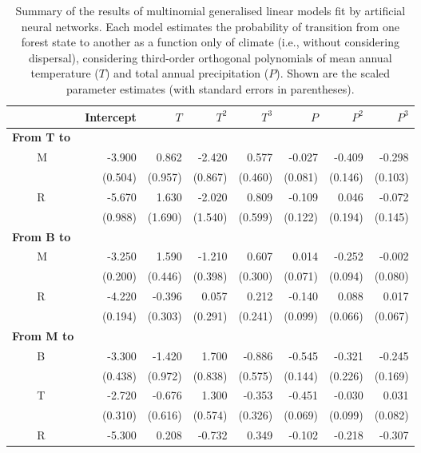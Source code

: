 \documentclass[11pt]{article}
\begin{document}
\begin{table}

\caption[Multinomial regression summary]{Summary of the results of multinomial generalised linear models fit by artificial neural networks.
Each model estimates the probability of transition from one forest state to another as a function only of climate (i.e., without considering dispersal), considering third-order orthogonal polynomials of mean annual temperature ($T$) and total annual precipitation ($P$).
Shown are the scaled parameter estimates (with standard errors in parentheses).
}

\begin{tabular}{llrrrrrrr}
\toprule
  &  & Intercept & $T$ & $T^2$ & $T^3$ & $P$ & $P^2$ & $P^3$ \\
\midrule
\multicolumn{2}{l}{\textbf{From T to}} \\
& \multirow{2}{*}{M} & -3.900 &  0.862 & -2.420 &  0.577 & -0.027 & -0.409 & -0.298 \\
& & (0.504) &  (0.957) &  (0.867) &  (0.460) &  (0.081) &  (0.146) &  (0.103) \\[3pt]
& \multirow{2}{*}{R} & -5.670 &  1.630 & -2.020 &  0.809 & -0.109 &  0.046 & -0.072 \\
& & (0.988) &  (1.690) &  (1.540) &  (0.599) &  (0.122) &  (0.194) &  (0.145) \\[3pt]
\multicolumn{2}{l}{\textbf{From B to}} \\
& \multirow{2}{*}{M} & -3.250 &  1.590 & -1.210 &  0.607 &  0.014 & -0.252 & -0.002 \\
& & (0.200) &  (0.446) &  (0.398) &  (0.300) &  (0.071) &  (0.094) &  (0.080) \\[3pt]
& \multirow{2}{*}{R} & -4.220 & -0.396 &  0.057 &  0.212 & -0.140 &  0.088 &  0.017 \\
& & (0.194) &  (0.303) &  (0.291) &  (0.241) &  (0.099) &  (0.066) &  (0.067) \\[3pt]
\multicolumn{2}{l}{\textbf{From M to}} \\
& \multirow{2}{*}{B} & -3.300 & -1.420 &  1.700 & -0.886 & -0.545 & -0.321 & -0.245 \\
& & (0.438) &  (0.972) &  (0.838) &  (0.575) &  (0.144) &  (0.226) &  (0.169) \\[3pt]
& \multirow{2}{*}{T} & -2.720 & -0.676 &  1.300 & -0.353 & -0.451 & -0.030 &  0.031 \\
& & (0.310) &  (0.616) &  (0.574) &  (0.326) &  (0.069) &  (0.099) &  (0.082) \\[3pt]
& \multirow{2}{*}{R} & -5.300 &  0.208 & -0.732 &  0.349 & -0.102 & -0.218 & -0.307 \\

\end{tabular}
\end{table}
\end{document}
